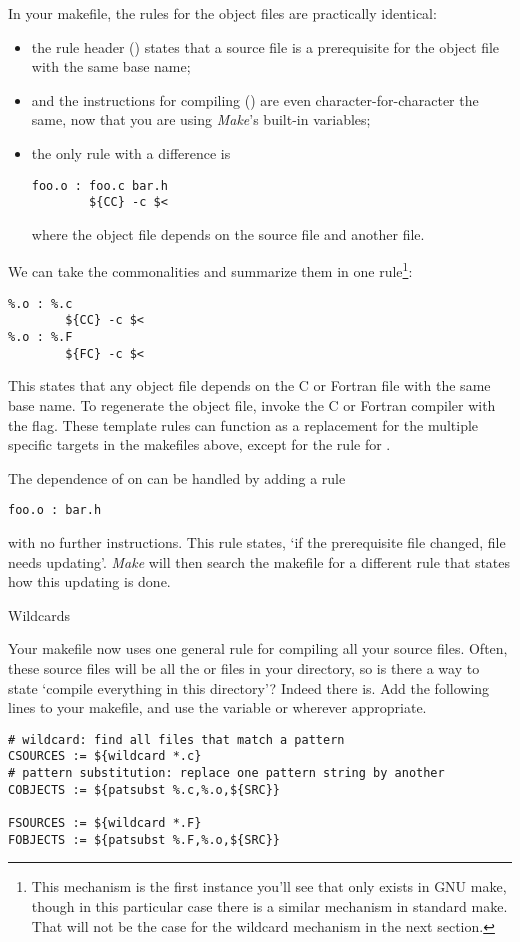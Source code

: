 In your makefile, the rules for the object files are practically
identical:
\begin{itemize}
\item the rule header () states that a source file is a
  prerequisite for the object file with the same base name;
\item and the instructions for compiling () 
  are even character-for-character the
  same, now that you are using \emph{Make}'s built-in variables;
\item the only rule with a difference is 
\begin{verbatim}
foo.o : foo.c bar.h
        ${CC} -c $<
\end{verbatim}
  where the object file depends on the source file and another file.
\end{itemize}
We can take the commonalities and summarize them in one rule\footnote
{This mechanism is the first instance you'll see that only exists in
  GNU make, though in this particular case there is a similar
  mechanism in standard make. That will not be the case for the
  wildcard mechanism in the next section.}:
\begin{verbatim}
%.o : %.c
        ${CC} -c $<
%.o : %.F
        ${FC} -c $<
\end{verbatim}
This states that any object file depends on the C or Fortran file with
the same base name. To regenerate the object file, invoke the C or
Fortran compiler with the  flag.
These template rules can function as a replacement for the multiple
specific targets in the makefiles above, except for the rule for .

The dependence of  on  can be handled by adding a rule
\begin{verbatim}
foo.o : bar.h
\end{verbatim}
with no further instructions. This rule states, `if the prerequisite file
 changed, file  needs updating'. \emph{Make} will
then search the makefile for a different
rule that states how this updating is done. 


 {Wildcards}

Your makefile now uses one general rule for compiling all your source
files. Often, these source files will be all the  or 
files in your directory, so is there a way to state `compile
everything in this directory'? Indeed there is. Add the following lines
to your makefile, and use the variable  or 
wherever appropriate.
\begin{verbatim}
# wildcard: find all files that match a pattern
CSOURCES := ${wildcard *.c}
# pattern substitution: replace one pattern string by another
COBJECTS := ${patsubst %.c,%.o,${SRC}}

FSOURCES := ${wildcard *.F}
FOBJECTS := ${patsubst %.F,%.o,${SRC}}
\end{verbatim}


